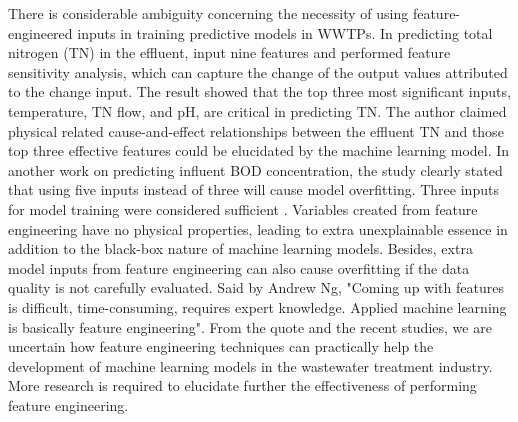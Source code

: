 There is considerable ambiguity concerning the necessity of using feature-engineered inputs in training predictive models in WWTPs. In predicting total nitrogen (TN) in the effluent, \citet{guoPredictionEffluentConcentration2015} input nine features and performed feature sensitivity analysis, which can capture the change of the output values attributed to the change input. The result showed that the top three most significant inputs, temperature, TN flow, and pH, are critical in predicting TN. The author claimed physical related cause-and-effect relationships between the effluent TN and those top three effective features could be elucidated by the machine learning model. In another work on predicting influent BOD concentration, the study clearly stated that using five inputs instead of three will cause model overfitting. Three inputs for model training were considered sufficient \citep{alsulailiArtificialNeuralNetwork2021}. Variables created from feature engineering have no physical properties, leading to extra unexplainable essence in addition to the black-box nature of machine learning models. Besides, extra model inputs from feature engineering can also cause overfitting if the data quality is not carefully evaluated. Said by Andrew Ng, "Coming up with features is difficult, time-consuming, requires expert knowledge. Applied machine learning is basically feature engineering". From the quote and the recent studies, we are uncertain how feature engineering techniques can practically help the development of machine learning models in the wastewater treatment industry. More research is required to elucidate further the effectiveness of performing feature engineering.